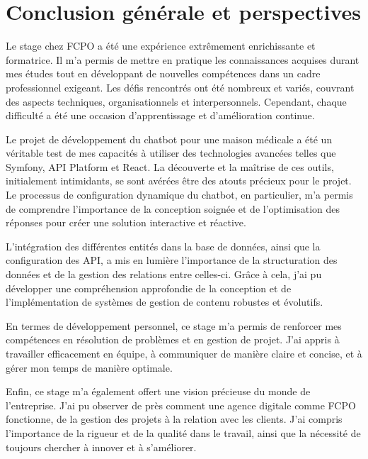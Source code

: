 \chapter*{Conclusion générale et perspectives}




\label{chap:General Conclusion} 

\hspace{16pt}Le stage chez FCPO a été une expérience extrêmement enrichissante et formatrice. Il m'a permis de mettre en pratique les connaissances acquises durant mes études tout en développant de nouvelles compétences dans un cadre professionnel exigeant. Les défis rencontrés ont été nombreux et variés, couvrant des aspects techniques, organisationnels et interpersonnels. Cependant, chaque difficulté a été une occasion d'apprentissage et d'amélioration continue.

Le projet de développement du chatbot pour une maison médicale a été un véritable test de mes capacités à utiliser des technologies avancées telles que Symfony, API Platform et React. La découverte et la maîtrise de ces outils, initialement intimidants, se sont avérées être des atouts précieux pour le projet. Le processus de configuration dynamique du chatbot, en particulier, m'a permis de comprendre l'importance de la conception soignée et de l'optimisation des réponses pour créer une solution interactive et réactive.

L'intégration des différentes entités dans la base de données, ainsi que la configuration des API, a mis en lumière l'importance de la structuration des données et de la gestion des relations entre celles-ci. Grâce à cela, j'ai pu développer une compréhension approfondie de la conception et de l'implémentation de systèmes de gestion de contenu robustes et évolutifs.

En termes de développement personnel, ce stage m'a permis de renforcer mes compétences en résolution de problèmes et en gestion de projet. J'ai appris à travailler efficacement en équipe, à communiquer de manière claire et concise, et à gérer mon temps de manière optimale.

Enfin, ce stage m'a également offert une vision précieuse du monde de l'entreprise. J'ai pu observer de près comment une agence digitale comme FCPO fonctionne, de la gestion des projets à la relation avec les clients. J'ai compris l'importance de la rigueur et de la qualité dans le travail, ainsi que la nécessité de toujours chercher à innover et à s'améliorer.

